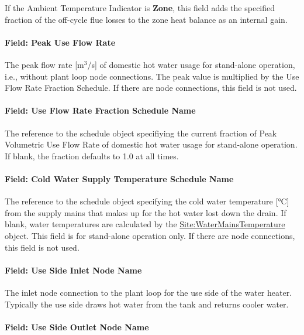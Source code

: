 If the Ambient Temperature Indicator is \textbf{Zone}, this field adds the specified fraction of the off-cycle flue losses to the zone heat balance as an internal gain.

\paragraph{Field: Peak Use Flow Rate}\label{field-peak-use-flow-rate-1}

The peak flow rate {[}m\(^{3}\)/s{]} of domestic hot water usage for stand-alone operation, i.e., without plant loop node connections. The peak value is multiplied by the Use Flow Rate Fraction Schedule. If there are node connections, this field is not used.

\paragraph{Field: Use Flow Rate Fraction Schedule Name}\label{field-use-flow-rate-fraction-schedule-name-1}

The reference to the schedule object specifiying the current fraction of Peak Volumetric Use Flow Rate of domestic hot water usage for stand-alone operation. If blank, the fraction defaults to 1.0 at all times.

\paragraph{Field: Cold Water Supply Temperature Schedule Name}\label{field-cold-water-supply-temperature-schedule-name-1}

The reference to the schedule object specifying the cold water temperature {[}°C{]} from the supply mains that makes up for the hot water lost down the drain. If blank, water temperatures are calculated by the \hyperref[sitewatermainstemperature]{Site:WaterMainsTemperature} object. This field is for stand-alone operation only. If there are node connections, this field is not used.

\paragraph{Field: Use Side Inlet Node Name}\label{field-use-side-inlet-node-name-1-000}

The inlet node connection to the plant loop for the use side of the water heater. Typically the use side draws hot water from the tank and returns cooler water.

\paragraph{Field: Use Side Outlet Node Name}\label{field-use-side-outlet-node-name-1-000}

